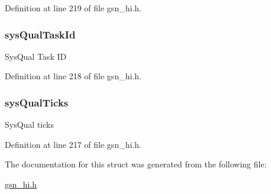 Definition at line 219 of file gsn\_\-hi.h.

\hypertarget{a00088_a3d8d24efe6d7728a0e60320295f3f6c2}{
\subsubsection[{sysQualTaskId}]{ {\bf sysQualTaskId}}}
\label{a00088_a3d8d24efe6d7728a0e60320295f3f6c2}
SysQual Task ID 

Definition at line 218 of file gsn\_\-hi.h.

\hypertarget{a00088_a3b8eb219c70a5f7fc6dcb9d9643cbc31}{
\subsubsection[{sysQualTicks}]{ {\bf sysQualTicks}}}
\label{a00088_a3b8eb219c70a5f7fc6dcb9d9643cbc31}
SysQual ticks 

Definition at line 217 of file gsn\_\-hi.h.



The documentation for this struct was generated from the following file:\begin{DoxyCompactItemize}
\item 
\hyperlink{a00504}{gsn\_\-hi.h}\end{DoxyCompactItemize}
